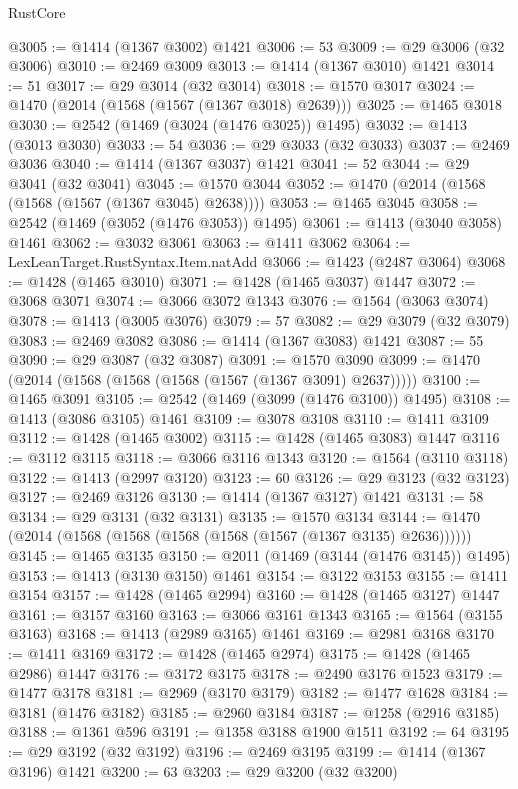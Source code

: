 \begin{lexlean}{RustCore}
\begin{coremodule}
@3005 := @1414 (@1367 @3002) @1421
@3006 := 53
@3009 := @29 @3006 (@32 @3006)
@3010 := @2469 @3009
@3013 := @1414 (@1367 @3010) @1421
@3014 := 51
@3017 := @29 @3014 (@32 @3014)
@3018 := @1570 @3017
@3024 := @1470 (@2014 (@1568 (@1567 (@1367 @3018) @2639)))
@3025 := @1465 @3018
@3030 := @2542 (@1469 (@3024 (@1476 @3025)) @1495)
@3032 := @1413 (@3013 @3030)
@3033 := 54
@3036 := @29 @3033 (@32 @3033)
@3037 := @2469 @3036
@3040 := @1414 (@1367 @3037) @1421
@3041 := 52
@3044 := @29 @3041 (@32 @3041)
@3045 := @1570 @3044
@3052 := @1470 (@2014 (@1568 (@1568 (@1567 (@1367 @3045) @2638))))
@3053 := @1465 @3045
@3058 := @2542 (@1469 (@3052 (@1476 @3053)) @1495)
@3061 := @1413 (@3040 @3058) @1461
@3062 := @3032 @3061
@3063 := @1411 @3062
@3064 := LexLeanTarget.RustSyntax.Item.natAdd
@3066 := @1423 (@2487 @3064)
@3068 := @1428 (@1465 @3010)
@3071 := @1428 (@1465 @3037) @1447
@3072 := @3068 @3071
@3074 := @3066 @3072 @1343
@3076 := @1564 (@3063 @3074)
@3078 := @1413 (@3005 @3076)
@3079 := 57
@3082 := @29 @3079 (@32 @3079)
@3083 := @2469 @3082
@3086 := @1414 (@1367 @3083) @1421
@3087 := 55
@3090 := @29 @3087 (@32 @3087)
@3091 := @1570 @3090
@3099 := @1470 (@2014 (@1568 (@1568 (@1568 (@1567 (@1367 @3091) @2637)))))
@3100 := @1465 @3091
@3105 := @2542 (@1469 (@3099 (@1476 @3100)) @1495)
@3108 := @1413 (@3086 @3105) @1461
@3109 := @3078 @3108
@3110 := @1411 @3109
@3112 := @1428 (@1465 @3002)
@3115 := @1428 (@1465 @3083) @1447
@3116 := @3112 @3115
@3118 := @3066 @3116 @1343
@3120 := @1564 (@3110 @3118)
@3122 := @1413 (@2997 @3120)
@3123 := 60
@3126 := @29 @3123 (@32 @3123)
@3127 := @2469 @3126
@3130 := @1414 (@1367 @3127) @1421
@3131 := 58
@3134 := @29 @3131 (@32 @3131)
@3135 := @1570 @3134
@3144 := @1470 (@2014 (@1568 (@1568 (@1568 (@1568 (@1567 (@1367 @3135) @2636))))))
@3145 := @1465 @3135
@3150 := @2011 (@1469 (@3144 (@1476 @3145)) @1495)
@3153 := @1413 (@3130 @3150) @1461
@3154 := @3122 @3153
@3155 := @1411 @3154
@3157 := @1428 (@1465 @2994)
@3160 := @1428 (@1465 @3127) @1447
@3161 := @3157 @3160
@3163 := @3066 @3161 @1343
@3165 := @1564 (@3155 @3163)
@3168 := @1413 (@2989 @3165) @1461
@3169 := @2981 @3168
@3170 := @1411 @3169
@3172 := @1428 (@1465 @2974)
@3175 := @1428 (@1465 @2986) @1447
@3176 := @3172 @3175
@3178 := @2490 @3176 @1523
@3179 := @1477 @3178
@3181 := @2969 (@3170 @3179)
@3182 := @1477 @1628
@3184 := @3181 (@1476 @3182)
@3185 := @2960 @3184
@3187 := @1258 (@2916 @3185)
@3188 := @1361 @596
@3191 := @1358 @3188 @1900 @1511
@3192 := 64
@3195 := @29 @3192 (@32 @3192)
@3196 := @2469 @3195
@3199 := @1414 (@1367 @3196) @1421
@3200 := 63
@3203 := @29 @3200 (@32 @3200)

\end{coremodule}
\end{lexlean}
